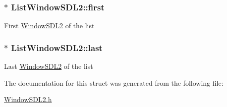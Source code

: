 \subsubsection[{\texorpdfstring{first}{first}}]{$\ast$ List\+Window\+S\+D\+L2\+::first}\hypertarget{structListWindowSDL2_aa97229f3f9f48a602b2a96bfc1bb2bf9}{}\label{structListWindowSDL2_aa97229f3f9f48a602b2a96bfc1bb2bf9}
First \hyperlink{structWindowSDL2}{Window\+S\+D\+L2} of the list 
\subsubsection[{\texorpdfstring{last}{last}}]{$\ast$ List\+Window\+S\+D\+L2\+::last}\hypertarget{structListWindowSDL2_ae71123501af1a866d08d4eab4b026b41}{}\label{structListWindowSDL2_ae71123501af1a866d08d4eab4b026b41}
Last \hyperlink{structWindowSDL2}{Window\+S\+D\+L2} of the list 

The documentation for this struct was generated from the following file\+:\begin{DoxyCompactItemize}
\item 
\hyperlink{WindowSDL2_8h}{Window\+S\+D\+L2.\+h}\end{DoxyCompactItemize}
